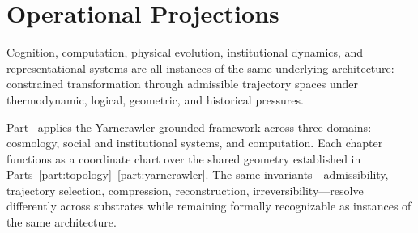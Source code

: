\part{Operational Projections}
\label{part:projections}

\epigraph{Cognition, computation, physical evolution, institutional dynamics, and
representational systems are all instances of the same underlying architecture:
constrained transformation through admissible trajectory spaces under thermodynamic,
logical, geometric, and historical pressures.}{}

\noindent Part~\ref{part:projections} applies the Yarncrawler-grounded framework
across three domains: cosmology, social and institutional systems, and computation.
Each chapter functions as a coordinate chart over the shared geometry established
in Parts~\ref{part:topology}--\ref{part:yarncrawler}. The same invariants---admissibility,
trajectory selection, compression, reconstruction, irreversibility---resolve differently
across substrates while remaining formally recognizable as instances of the same
architecture.
\cleardoublepage

